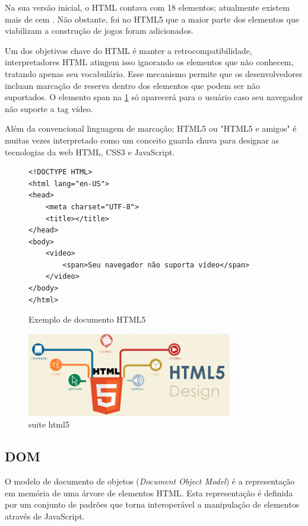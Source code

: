 \documentclass[
12pt,
a4paper,
portuges,
draft
]{report}
\begin{document}
Na sua versão inicial, o HTML contava com 18 elementos;
atualmente existem mais de cem \autocite{diveIntohtml}.
Não obstante, foi no HTML5 que a maior parte dos elementos
que viabilizam a construção de jogos foram adicionados.

Um dos objetivos chave do HTML é manter a retrocompatibilidade,
interpretadores HTML atingem isso ignorando os elementos que não
conhecem, tratando apenas seu vocabulário. Esse mecanismo permite que
os desenvolvedores incluam marcação de reserva dentro dos elementos
que podem ser não suportados. O elemento span na \ref{fig:htmlSample}
só aparecerá para o usuário caso seu navegador não suporte a tag
vídeo.

Além da convencional linguagem de marcação; HTML5 ou "HTML5 e amigos"
é muitas vezes interpretado como um conceito guarda chuva para designar
as tecnologias da web HTML, CSS3 e JavaScript.

\begin{figure}
\centering
\begin{verbatim}
<!DOCTYPE HTML>
<html lang="en-US">
<head>
	<meta charset="UTF-8">
	<title></title>
</head>
<body>
    <video>
        <span>Seu navegador não suporta vídeo</span>
    </video>
</body>
</html>
\end{verbatim}
\caption{Exemplo de documento HTML5}
\label{fig:htmlSample}
\end{figure}

\begin{figure}
    \centering
    \includegraphics[width=0.8\textwidth,natwidth=610,natheight=642]{html5.jpg}
	\caption{suite html5}
\end{figure}
\subsection{DOM}

O modelo de documento de objetos (\textit{Document Object Model}) é a representação
em memória de uma árvore de elementos HTML. Esta representação é definida por
um conjunto de padrões que torna interoperável a manipulação de elementos através de
JavaScript.
\end{document}
